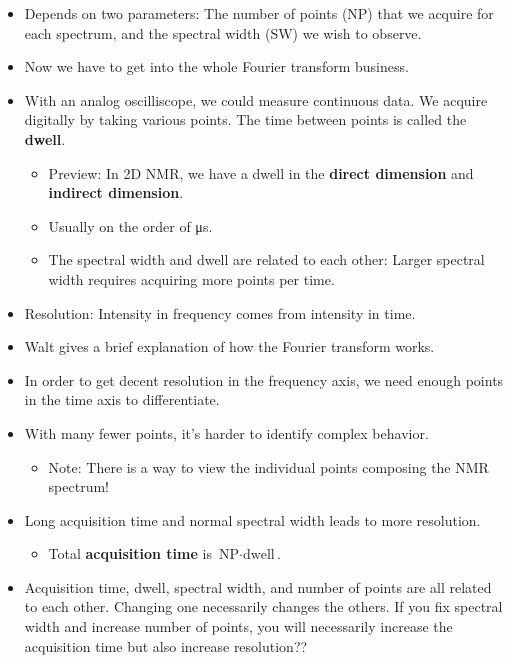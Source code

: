 \documentclass[../notes.tex]{subfiles}
\begin{document}
\begin{itemize}
\begin{itemize}
        \item Depends on two parameters: The number of points (NP) that we acquire for each spectrum, and the spectral width (SW) we wish to observe.
        \item Now we have to get into the whole Fourier transform business.
        \item With an analog oscilliscope, we could measure continuous data. We acquire digitally by taking various points. The time between points is called the \textbf{dwell}.
        \begin{itemize}
            \item Preview: In 2D NMR, we have a dwell in the \textbf{direct dimension} and \textbf{indirect dimension}.
            \item Usually on the order of \si{\micro\second}.
            \item The spectral width and dwell are related to each other: Larger spectral width requires acquiring more points per time.
        \end{itemize}
        \item Resolution: Intensity in frequency comes from intensity in time.
        \item Walt gives a brief explanation of how the Fourier transform works.
        \item In order to get decent resolution in the frequency axis, we need enough points in the time axis to differentiate.
        \item With many fewer points, it's harder to identify complex behavior.
        \begin{itemize}
            \item Note: There is a way to view the individual points composing the NMR spectrum!
        \end{itemize}
        \item Long acquisition time and normal spectral width leads to more resolution.
        \begin{itemize}
            \item Total \textbf{acquisition time} is $\text{NP}\cdot\text{dwell}$.
        \end{itemize}
        \item Acquisition time, dwell, spectral width, and number of points are all related to each other. Changing one necessarily changes the others. If you fix spectral width and increase number of points, you will necessarily increase the acquisition time but also increase resolution??
        \begin{itemize}

\end{itemize}
\end{itemize}
\end{itemize}
\end{document}
